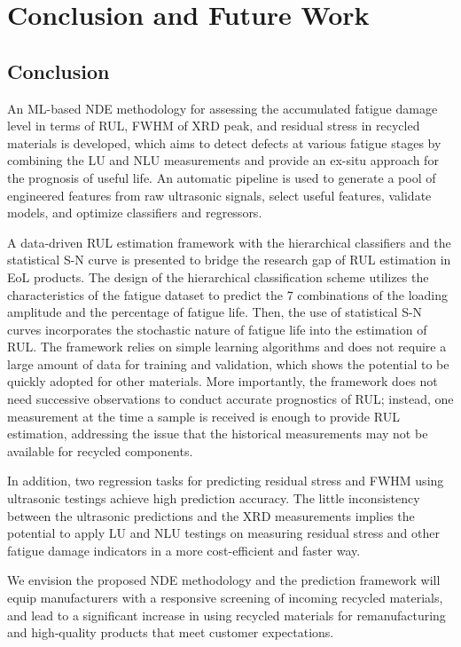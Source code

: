 \chapter{Conclusion and Future Work}
\label{chap: concl}

\section{Conclusion}
An ML-based NDE methodology for assessing the accumulated fatigue damage level in terms of RUL, FWHM of XRD peak, and residual stress in recycled materials is developed, which aims to detect defects at various fatigue stages by combining the LU and NLU measurements and provide an ex-situ approach for the prognosis of useful life. An automatic pipeline is used to generate a pool of engineered features from raw ultrasonic signals, select useful features, validate models, and optimize classifiers and regressors. 

A data-driven RUL estimation framework with the hierarchical classifiers and the statistical S-N curve is presented to bridge the research gap of RUL estimation in EoL products. The design of the hierarchical classification scheme utilizes the characteristics of the fatigue dataset to predict the 7 combinations of the loading amplitude and the percentage of fatigue life. Then, the use of statistical S-N curves incorporates the stochastic nature of fatigue life into the estimation of RUL. The framework relies on simple learning algorithms and does not require a large amount of data for training and validation, which shows the potential to be quickly adopted for other materials. More importantly, the framework does not need successive observations to conduct accurate prognostics of RUL; instead, one measurement at the time a sample is received is enough to provide RUL estimation, addressing the issue that the historical measurements may not be available for recycled components.

In addition, two regression tasks for predicting residual stress and FWHM using ultrasonic testings achieve high prediction accuracy. The little inconsistency between the ultrasonic predictions and the XRD measurements implies the potential to apply LU and NLU testings on measuring residual stress and other fatigue damage indicators in a more cost-efficient and faster way.

We envision the proposed NDE methodology and the prediction framework will equip manufacturers with a responsive screening of incoming recycled materials, and lead to a significant increase in using recycled materials for remanufacturing and high‐quality products that meet customer expectations.

